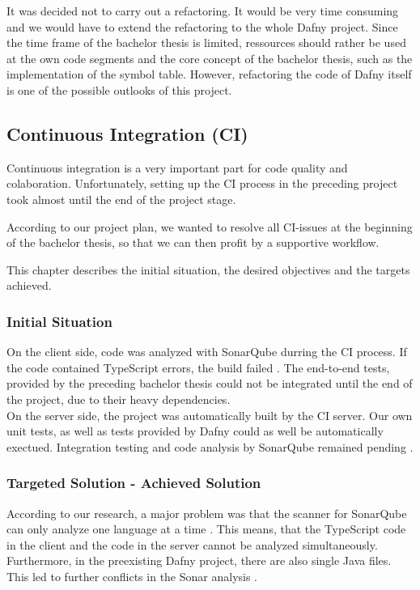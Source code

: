 It was decided not to carry out a refactoring.
It would be very time consuming and we would have to extend the refactoring to the whole Dafny project.
Since the time frame of the bachelor thesis is limited, ressources should rather be used at the own code segments and the core concept of the bachelor thesis, such as the implementation of the symbol table.
However, refactoring the code of Dafny itself is one of the possible outlooks of this project.






\subsection{Continuous Integration (CI)}
Continuous integration is a very important part for code quality and colaboration.
Unfortunately, setting up the CI process in the preceding project\cite{sa} took almost until the end of the project stage.

According to our project plan, we wanted to resolve all CI-issues at the beginning of the bachelor thesis, so that we can then profit by a supportive workflow.

This chapter describes the initial situation, the desired objectives and the targets achieved.

\subsubsection{Initial Situation}
On the client side, code was analyzed with SonarQube durring the CI process.
If the code contained TypeScript errors, the build failed \cite{sa}.
The end-to-end tests, provided by the preceding bachelor thesis\cite{ba} could not be integrated until the end of the project, due to their heavy dependencies.\\

On the server side, the project was automatically built by the CI server.
Our own unit tests, as well as tests provided by Dafny could as well be automatically exectued.
Integration testing and code analysis by SonarQube remained pending \cite{sa}.

\subsubsection{Targeted Solution - Achieved Solution}
According to our research, a major problem was that the scanner for SonarQube can only analyze one language at a time \cite{sonar-supports-only-one-language}.
This means, that the TypeScript code in the client and the \Csharp code in the server cannot be analyzed simultaneously.
Furthermore, in the preexisting Dafny project, there are also single Java files.
This led to further conflicts in the Sonar analysis \cite{sa}.\\

